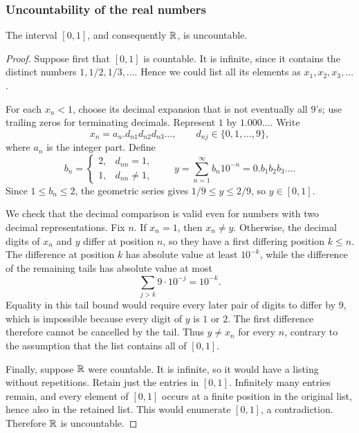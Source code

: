 \documentclass[11pt,a4paper]{amsart}
\begin{document}
\subsubsection{Uncountability of the real numbers}

\begin{theorem}
  The interval \([0,1]\), and consequently \(\mathbb{R}\), is uncountable.
\end{theorem}

\begin{proof}
  Suppose first that \([0,1]\) is countable. It is infinite, since it
  contains the distinct numbers \(1,1/2,1/3,\ldots\). Hence we could
  list all its elements as \(x_1,x_2,x_3,\ldots\).

  For each \(x_n<1\), choose its decimal expansion that is not
  eventually all \(9\)'s; use trailing zeros for terminating decimals.
  Represent \(1\) by \(1.000\ldots\). Write
  \[
    x_n=a_n.d_{n1}d_{n2}d_{n3}\ldots,
    \qquad d_{nj}\in\{0,1,\ldots,9\},
  \]
  where \(a_n\) is the integer part. Define
  \[
    b_n=
    \begin{cases}
      2,&d_{nn}=1,\\
      1,&d_{nn}\neq1,
    \end{cases}
    \qquad y=\sum_{n=1}^{\infty}b_n10^{-n}=0.b_1b_2b_3\ldots.
  \]
  Since \(1\leq b_n\leq2\), the geometric series gives
  \(1/9\leq y\leq2/9\), so \(y\in[0,1]\).

  We check that the decimal comparison is valid even for numbers with
  two decimal representations. Fix \(n\). If \(x_n=1\), then
  \(x_n\neq y\). Otherwise, the decimal digits of \(x_n\) and \(y\)
  differ at position \(n\), so they have a first differing position
  \(k\leq n\). The difference at position \(k\) has absolute value
  at least \(10^{-k}\), while the difference of the remaining tails
  has absolute value at most
  \[
    \sum_{j>k}9\cdot10^{-j}=10^{-k}.
  \]
  Equality in this tail bound would require every later pair of digits
  to differ by \(9\), which is impossible because every digit of
  \(y\) is \(1\) or \(2\). The first difference therefore cannot be
  cancelled by the tail. Thus \(y\neq x_n\) for every \(n\), contrary
  to the assumption that the list contains all of \([0,1]\).

  Finally, suppose \(\mathbb{R}\) were countable. It is infinite, so it would
  have a listing without repetitions. Retain just the entries in
  \([0,1]\). Infinitely many entries remain, and every element of
  \([0,1]\) occurs at a finite position in the original list, hence
  also in the retained list. This would enumerate \([0,1]\), a
  contradiction. Therefore \(\mathbb{R}\) is uncountable.
\end{proof}
\end{document}
